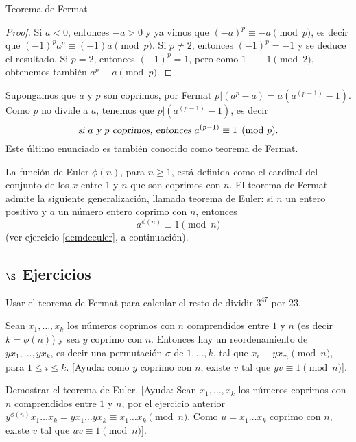 \begin{section}{Teorema de Fermat}
\begin{proof}
Si $a<0$, entonces $-a>0$ y ya vimos que $(-a)^p \equiv -a
\pmod{p}$, es decir que $(-1)^pa^p \equiv (-1)a \pmod{p}$. Si
$p\not=2$, entonces $(-1)^p=-1$ y se deduce el resultado. Si
$p=2$, entonces $(-1)^p=1$, pero como $1\equiv -1 \pmod{2}$,
obtenemos también $a^p\equiv a\pmod{p}$.
\end{proof}


Supongamos que $a$ y $p$ son coprimos, por Fermat $p|(a^p
-a)=a(a^{(p-1)} -1)$. Como $p$ no divide a $a$, tenemos que
$p|(a^{(p-1)} -1)$, es decir 
$$
\textsl{si $a$ y $p$ coprimos, entonces } a^{(p-1)}\equiv 1\pmod{p}.
$$
Este último enunciado es también conocido como teorema de Fermat.



La función de Euler   $\phi(n)$, para
$n\ge 1$, está definida como el cardinal del conjunto de los $x$
entre 1 y $n$ que son coprimos con $n$. El
teorema de Fermat admite la siguiente generalización, llamada
teorema de Euler:  si $n$ un entero
positivo y $a$ un número entero coprimo con $n$, entonces
$$
a^{\phi(n)} \equiv 1\pmod{n}
$$
(ver ejercicio \ref{demdeeuler}, a continuación).

\subsection*{$\S$ Ejercicios}

\begin{enumex}
\item Usar el teorema de Fermat para calcular el resto de dividir
$3^{47}$ por $23$.

\item Sean $x_1,\ldots,x_k$ los números coprimos con $n$ comprendidos
entre $1$ y $n$ (es decir $k=\phi(n)$) y sea $y$ coprimo con $n$.
Entonces hay un reordenamiento de $yx_1,\ldots,yx_k$, es decir una
permutación $\sigma$ de $1,\ldots,k$, tal que $x_i \equiv
yx_{\sigma_i} \pmod{n}$, para $1\le i \le k$. [Ayuda: como $y$
coprimo con $n$, existe $v$ tal que $yv\equiv 1\pmod{n}$].

\item \label{demdeeuler}Demostrar el teorema de Euler. [Ayuda: Sean $x_1,\ldots,x_k$ los
números coprimos con $n$ comprendidos entre $1$ y $n$, por el
ejercicio anterior $y^{\phi(n)}x_1\ldots x_k =yx_1\ldots yx_k
\equiv x_1\ldots x_k \pmod{n}$. Como $u=x_1\ldots x_k$ coprimo con
$n$, existe $v$ tal que $uv\equiv 1\pmod{n}$].
\end{enumex}

\end{section}



